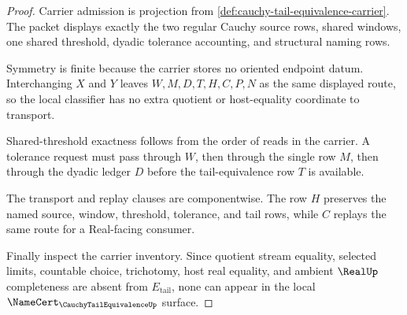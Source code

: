 \begin{proof}
Carrier admission is projection from \autoref{def:cauchy-tail-equivalence-carrier}. The packet displays exactly the two regular Cauchy source rows, shared windows, one shared threshold, dyadic tolerance accounting, and structural naming rows.

Symmetry is finite because the carrier stores no oriented endpoint datum. Interchanging $X$ and $Y$ leaves $W,M,D,T,H,C,P,N$ as the same displayed route, so the local classifier has no extra quotient or host-equality coordinate to transport.

Shared-threshold exactness follows from the order of reads in the carrier. A tolerance request must pass through $W$, then through the single row $M$, then through the dyadic ledger $D$ before the tail-equivalence row $T$ is available.

The transport and replay clauses are componentwise. The row $H$ preserves the named source, window, threshold, tolerance, and tail rows, while $C$ replays the same route for a Real-facing consumer.

Finally inspect the carrier inventory. Since quotient stream equality, selected limits, countable choice, trichotomy, host real equality, and ambient $\RealUp$ completeness are absent from $E_{\mathrm{tail}}$, none can appear in the local $\NameCert_{\CauchyTailEquivalenceUp}$ surface.
\end{proof}

